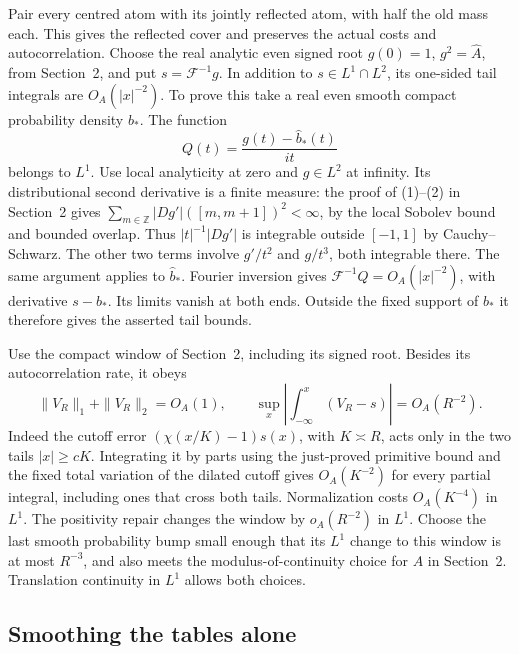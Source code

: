 \documentclass[11pt]{article}
\begin{document}
Pair every centred atom with its jointly reflected atom, with half the old mass each. This gives the reflected cover and preserves the actual costs and autocorrelation. Choose the real analytic even signed root \(g(0)=1\), \(g^2=\widehat A\), from Section~2, and put \(s=\mathcal F^{-1}g\). In addition to \(s\in L^1\cap L^2\), its one-sided tail integrals are \(O_A(|x|^{-2})\). To prove this take a real even smooth compact probability density \(b_*\). The function
\[
    Q(t)=\frac{g(t)-\widehat b_*(t)}{it}
\]
belongs to \(L^1\). Use local analyticity at zero and \(g\in L^2\) at infinity. Its distributional second derivative is a finite measure: the proof of (1)--(2) in Section~2 gives \(\sum_{m\in\mathbb Z}|Dg'|([m,m+1])^2<\infty\), by the local Sobolev bound and bounded overlap. Thus \(|t|^{-1}|Dg'|\) is integrable outside \([-1,1]\) by Cauchy--Schwarz. The other two terms involve \(g'/t^2\) and \(g/t^3\), both integrable there. The same argument applies to \(\widehat b_*\). Fourier inversion gives \(\mathcal F^{-1}Q=O_A(|x|^{-2})\), with derivative \(s-b_*\). Its limits vanish at both ends. Outside the fixed support of \(b_*\) it therefore gives the asserted tail bounds.

Use the compact window of Section~2, including its signed root. Besides its autocorrelation rate, it obeys
\[
  \|V_R\|_1+\|V_R\|_2=O_A(1),\qquad
  \sup_x\left|\int_{-\infty}^x(V_R-s)\right|=O_A(R^{-2}).          \tag{5}
\]
Indeed the cutoff error \((\chi(x/K)-1)s(x)\), with \(K\asymp R\), acts only in the two tails \(|x|\ge cK\). Integrating it by parts using the just-proved primitive bound and the fixed total variation of the dilated cutoff gives \(O_A(K^{-2})\) for every partial integral, including ones that cross both tails. Normalization costs \(O_A(K^{-4})\) in \(L^1\). The positivity repair changes the window by \(o_A(R^{-2})\) in \(L^1\). Choose the last smooth probability bump small enough that its \(L^1\) change to this window is at most \(R^{-3}\), and also meets the modulus-of-continuity choice for \(A\) in Section~2. Translation continuity in \(L^1\) allows both choices.

\subsection{Smoothing the tables alone}
\end{document}
